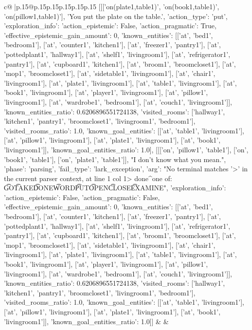 \documentclass{article}
\begin{document}
{\begin{supertabular}{c@{$\;$}|p{.15\linewidth}@{}p{.15\linewidth}p{.15\linewidth}p{.15\linewidth}p{.15\linewidth}p{.15\linewidth}}
{{{	 [[['on(plate1,table1)', 'on(book1,table1)', 'on(pillow1,table1)'], 'You put the plate on the table.', {'action_type': 'put', 'exploration_info': {'action_epistemic': False, 'action_pragmatic': True, 'effective_epistemic_gain_amount': 0, 'known_entities': [['at', 'bed1', 'bedroom1'], ['at', 'counter1', 'kitchen1'], ['at', 'freezer1', 'pantry1'], ['at', 'pottedplant1', 'hallway1'], ['at', 'shelf1', 'livingroom1'], ['at', 'refrigerator1', 'pantry1'], ['at', 'cupboard1', 'kitchen1'], ['at', 'broom1', 'broomcloset1'], ['at', 'mop1', 'broomcloset1'], ['at', 'sidetable1', 'livingroom1'], ['at', 'chair1', 'livingroom1'], ['at', 'plate1', 'livingroom1'], ['at', 'table1', 'livingroom1'], ['at', 'book1', 'livingroom1'], ['at', 'player1', 'livingroom1'], ['at', 'pillow1', 'livingroom1'], ['at', 'wardrobe1', 'bedroom1'], ['at', 'couch1', 'livingroom1']], 'known_entities_ratio': 0.6206896551724138, 'visited_rooms': ['hallway1', 'kitchen1', 'pantry1', 'broomcloset1', 'livingroom1', 'bedroom1'], 'visited_rooms_ratio': 1.0, 'known_goal_entities': [['at', 'table1', 'livingroom1'], ['at', 'pillow1', 'livingroom1'], ['at', 'plate1', 'livingroom1'], ['at', 'book1', 'livingroom1']], 'known_goal_entities_ratio': 1.0}}], [[['on', 'pillow1', 'table1'], ['on', 'book1', 'table1'], ['on', 'plate1', 'table1']], "I don't know what you mean.", {'phase': 'parsing', 'fail_type': 'lark_exception', 'arg': "No terminal matches '>' in the current parser context, at line 1 col 1\n\n> done\n^\nExpected one of: \n\t* GO\n\t* TAKE\n\t* DONE\n\t* WORD\n\t* PUT\n\t* OPEN\n\t* CLOSE\n\t* EXAMINE\n", 'exploration_info': {'action_epistemic': False, 'action_pragmatic': False, 'effective_epistemic_gain_amount': 0, 'known_entities': [['at', 'bed1', 'bedroom1'], ['at', 'counter1', 'kitchen1'], ['at', 'freezer1', 'pantry1'], ['at', 'pottedplant1', 'hallway1'], ['at', 'shelf1', 'livingroom1'], ['at', 'refrigerator1', 'pantry1'], ['at', 'cupboard1', 'kitchen1'], ['at', 'broom1', 'broomcloset1'], ['at', 'mop1', 'broomcloset1'], ['at', 'sidetable1', 'livingroom1'], ['at', 'chair1', 'livingroom1'], ['at', 'plate1', 'livingroom1'], ['at', 'table1', 'livingroom1'], ['at', 'book1', 'livingroom1'], ['at', 'player1', 'livingroom1'], ['at', 'pillow1', 'livingroom1'], ['at', 'wardrobe1', 'bedroom1'], ['at', 'couch1', 'livingroom1']], 'known_entities_ratio': 0.6206896551724138, 'visited_rooms': ['hallway1', 'kitchen1', 'pantry1', 'broomcloset1', 'livingroom1', 'bedroom1'], 'visited_rooms_ratio': 1.0, 'known_goal_entities': [['at', 'table1', 'livingroom1'], ['at', 'pillow1', 'livingroom1'], ['at', 'plate1', 'livingroom1'], ['at', 'book1', 'livingroom1']], 'known_goal_entities_ratio': 1.0}}]] 
	  } 
	   } 
	   } 
	 & & \\ 
 


\end{supertabular}}
\end{document}
